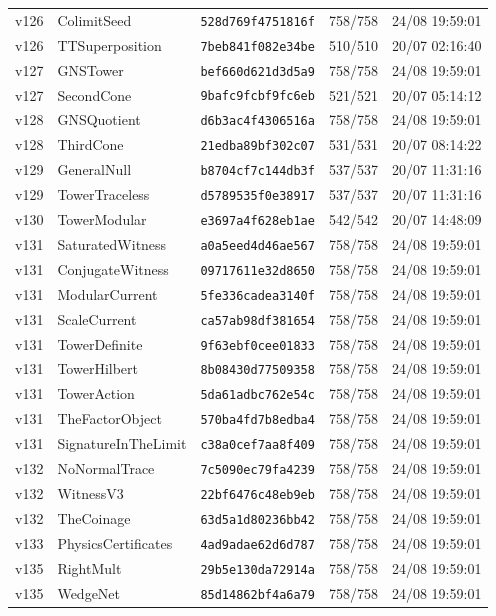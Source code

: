 \documentclass[11pt]{article}
\theoremstyle{definition}\newtheorem{deriv}{Derivação}
\begin{document}
{\begin{longtable}{@{}lllll@{}}
v126 & ColimitSeed & \texttt{528d769f4751816f} & 758/758 & 24/08 19:59:01 \\
v126 & TTSuperposition & \texttt{7beb841f082e34be} & 510/510 & 20/07 02:16:40 \\
v127 & GNSTower & \texttt{bef660d621d3d5a9} & 758/758 & 24/08 19:59:01 \\
v127 & SecondCone & \texttt{9bafc9fcbf9fc6eb} & 521/521 & 20/07 05:14:12 \\
v128 & GNSQuotient & \texttt{d6b3ac4f4306516a} & 758/758 & 24/08 19:59:01 \\
v128 & ThirdCone & \texttt{21edba89bf302c07} & 531/531 & 20/07 08:14:22 \\
v129 & GeneralNull & \texttt{b8704cf7c144db3f} & 537/537 & 20/07 11:31:16 \\
v129 & TowerTraceless & \texttt{d5789535f0e38917} & 537/537 & 20/07 11:31:16 \\
v130 & TowerModular & \texttt{e3697a4f628eb1ae} & 542/542 & 20/07 14:48:09 \\
v131 & SaturatedWitness & \texttt{a0a5eed4d46ae567} & 758/758 & 24/08 19:59:01 \\
v131 & ConjugateWitness & \texttt{09717611e32d8650} & 758/758 & 24/08 19:59:01 \\
v131 & ModularCurrent & \texttt{5fe336cadea3140f} & 758/758 & 24/08 19:59:01 \\
v131 & ScaleCurrent & \texttt{ca57ab98df381654} & 758/758 & 24/08 19:59:01 \\
v131 & TowerDefinite & \texttt{9f63ebf0cee01833} & 758/758 & 24/08 19:59:01 \\
v131 & TowerHilbert & \texttt{8b08430d77509358} & 758/758 & 24/08 19:59:01 \\
v131 & TowerAction & \texttt{5da61adbc762e54c} & 758/758 & 24/08 19:59:01 \\
v131 & TheFactorObject & \texttt{570ba4fd7b8edba4} & 758/758 & 24/08 19:59:01 \\
v131 & SignatureInTheLimit & \texttt{c38a0cef7aa8f409} & 758/758 & 24/08 19:59:01 \\
v132 & NoNormalTrace & \texttt{7c5090ec79fa4239} & 758/758 & 24/08 19:59:01 \\
v132 & WitnessV3 & \texttt{22bf6476c48eb9eb} & 758/758 & 24/08 19:59:01 \\
v132 & TheCoinage & \texttt{63d5a1d80236bb42} & 758/758 & 24/08 19:59:01 \\
v133 & PhysicsCertificates & \texttt{4ad9adae62d6d787} & 758/758 & 24/08 19:59:01 \\
v135 & RightMult & \texttt{29b5e130da72914a} & 758/758 & 24/08 19:59:01 \\
v135 & WedgeNet & \texttt{85d14862bf4a6a79} & 758/758 & 24/08 19:59:01 \\
\bottomrule\end{longtable}}
\end{document}
